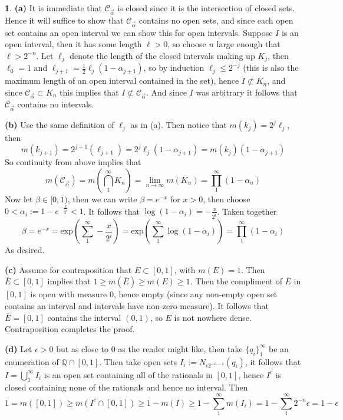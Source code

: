 \documentclass[10.5pt]{article}
\theoremstyle{definition}
\newtheorem{pb}{}
\newcommand{\set}[1]{\{#1\}}
\begin{document}
    \begin{pb}
        \textbf{(a)} It is immediate that \(\mathcal{C}_{\overrightarrow{\alpha}}\) is closed since it is the intersection of closed sets. Hence it will suffice to show that \(\mathcal{C}_{\overrightarrow{\alpha}}\)
        contains no open sets, and since each open set contains an open interval we can show this for open intervals. Suppose \(I\) is an open interval, then it has some length
        \(\ell > 0\), so choose \(n\) large enough that \(\ell > 2^{-n}\). Let \(\ell_j\) denote the length of the closed intervals making up \(K_j\), then \(\ell_{0} = 1\) and
        \(\ell_{j+1} = \frac12\ell_j(1- \alpha_{j+1})\), so by induction \(\ell_j \leq 2^{-j}\) (this is also the maximum length of an open interval contained in the set),
        hence \(I \not \subset K_n\), and since \(\mathcal{C}_{\overrightarrow{\alpha}}\subset K_n\) this implies that
        \(I \not \subset \mathcal{C}_{\overrightarrow{\alpha}}\). And since \(I\) was arbitrary it follows that \(\mathcal{C}_{\overrightarrow{\alpha}}\) contains no intervals.

        \textbf{(b)} Use the same definition of \(\ell_j\) as in (a). Then notice that \(m(k_j) = 2^j \ell_j\), then
        \[m(k_{j+1}) = 2^{j+1}(\ell_{j+1}) = 2^j \ell_j(1-\alpha_{j+1}) = m(k_j)(1-\alpha_{j+1})\]
        So continuity from above implies that 
        \[m(\mathcal{C}_{\overrightarrow{\alpha}}) = m\left(\bigcap_1^\infty K_n\right) = \lim_{n\to\infty}m(K_n) = \prod_1^\infty(1-\alpha_n)\]
        Now let \(\beta \in [0,1)\), then we can write \(\beta = e^{-x}\) for \(x > 0\), then choose \(0<\alpha_i := 1 - e^{-\frac{x}{2^i}}<1\).
        It follows that \(\log(1-\alpha_i) = -\frac{x}{2^i}\). Taken together
        \[\beta = e^{-x} = \text{exp}(\sum_1^\infty -\frac{x}{2^i}) = \text{exp}(\sum_1^\infty \log(1-\alpha_i)) = \prod_1^\infty(1-\alpha_i)\]
        As desired.

        \textbf{(c)} Assume for contraposition that \(E \subset [0,1]\), with \(m(E) = 1\). Then \(\overline{E} \subset [0,1]\) implies that \(1 \geq m(\overline{E}) \geq m(E) \geq 1\).
        Then the compliment of \(\overline{E}\) in \([0,1]\) is open with measure \(0\), hence empty (since any non-empty open set contains an interval and intervals have non-zero measure).
        It follows that \(\overline{E} = [0,1]\) contains the interval \((0,1)\), so \(E\) is not nowhere dense. Contraposition completes the proof.

        \textbf{(d)} Let \(\epsilon > 0\) but as close to \(0\) as the reader might like, then take \(\set{q_i}_1^\infty\) be an enumeration of
        \(\mathbb{Q} \cap [0,1]\). Then take open sets \(I_i := N_{\epsilon 2^{-n-1}}(q_i)\), it follows that \(I = \bigcup_1^\infty I_i\) is an open set containing all
        of the rationals in \([0,1]\), hence \(I^c\) is closed containing none of the rationals and hence no interval. Then
        \[1 = m([0,1]) \geq m(I^c \cap [0,1]) \geq 1-m(I) \geq 1 - \sum_1^\infty m(I_i) = 1 - \sum_1^\infty 2^{-n}\epsilon = 1 - \epsilon\]
    \end{pb}
\end{document}
